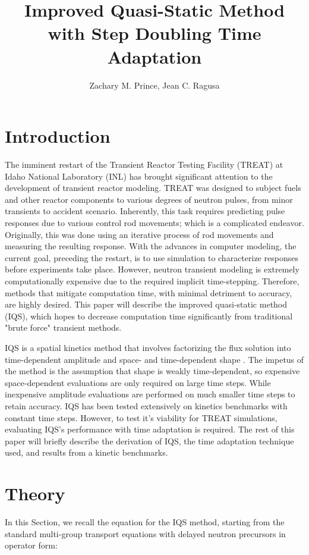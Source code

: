 \documentclass{anstrans}
\title{Improved Quasi-Static Method with Step Doubling Time Adaptation}
\author{Zachary M. Prince, Jean C. Ragusa}
\institute{
Department of Nuclear Engineering, Texas A\&M University, College Station, TX
}
\begin{document}

\section{Introduction}
The imminent restart of the Transient Reactor Testing Facility (TREAT) at Idaho National Laboratory (INL) has brought significant attention to the development of transient reactor modeling.  TREAT was designed to subject fuels and other reactor components to various degrees of neutron pulses, from minor transients to accident scenario.  Inherently, this task requires predicting pulse responses due to various control rod movements; which is a complicated endeavor.  Originally, this was done using an iterative process of rod movements and measuring the resulting response.  With the advances in computer modeling, the current goal, preceding the restart, is to use simulation to characterize responses before experiments take place.  However, neutron transient modeling is extremely computationally expensive due to the required implicit time-stepping.  Therefore, methods that mitigate computation time, with minimal detriment to accuracy, are highly desired.  This paper will describe the improved quasi-static method (IQS), which hopes to decrease computation time significantly from traditional "brute force" transient methods.

IQS is a spatial kinetics method that involves factorizing the flux solution into time-dependent amplitude and space- and time-dependent shape \cite{Ott_1966,Dulla2008}.  The impetus of the method is the assumption that shape is weakly time-dependent, so expensive space-dependent evaluations are only required on large time steps.  While inexpensive amplitude evaluations are performed on much smaller time steps to retain accuracy.  IQS has been tested extensively on kinetics benchmarks with constant time steps.  However, to test it's viability for TREAT simulations, evaluating IQS's performance with time adaptation is required.  The rest of this paper will briefly describe the derivation of IQS, the time adaptation technique used, and results from a kinetic benchmarks.

\section{Theory}
In this Section, we recall the equation for the IQS method, starting from the standard multi-group transport equations with delayed neutron precursors in operator form:
\end{document}
